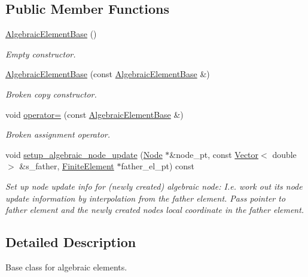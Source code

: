 \subsection*{Public Member Functions}
\begin{DoxyCompactItemize}
\item 
\hyperlink{classoomph_1_1AlgebraicElementBase_ac94e4a7116416add9539def19791f1b4}{Algebraic\+Element\+Base} ()
\begin{DoxyCompactList}\small\item\em Empty constructor. \end{DoxyCompactList}\item 
\hyperlink{classoomph_1_1AlgebraicElementBase_a992e105cff9c261ef9c809eb36ba288e}{Algebraic\+Element\+Base} (const \hyperlink{classoomph_1_1AlgebraicElementBase}{Algebraic\+Element\+Base} \&)
\begin{DoxyCompactList}\small\item\em Broken copy constructor. \end{DoxyCompactList}\item 
void \hyperlink{classoomph_1_1AlgebraicElementBase_a4eff2e63c21f61259e5625a622cc985f}{operator=} (const \hyperlink{classoomph_1_1AlgebraicElementBase}{Algebraic\+Element\+Base} \&)
\begin{DoxyCompactList}\small\item\em Broken assignment operator. \end{DoxyCompactList}\item 
void \hyperlink{classoomph_1_1AlgebraicElementBase_ab9ada27015d5cb28ae00b086ace3600f}{setup\+\_\+algebraic\+\_\+node\+\_\+update} (\hyperlink{classoomph_1_1Node}{Node} $\ast$\&node\+\_\+pt, const \hyperlink{classoomph_1_1Vector}{Vector}$<$ double $>$ \&s\+\_\+father, \hyperlink{classoomph_1_1FiniteElement}{Finite\+Element} $\ast$father\+\_\+el\+\_\+pt) const
\begin{DoxyCompactList}\small\item\em Set up node update info for (newly created) algebraic node\+: I.\+e. work out its node update information by interpolation from the father element. Pass pointer to father element and the newly created node\textquotesingle{}s local coordinate in the father element. \end{DoxyCompactList}\end{DoxyCompactItemize}


\subsection{Detailed Description}
Base class for algebraic elements. 

